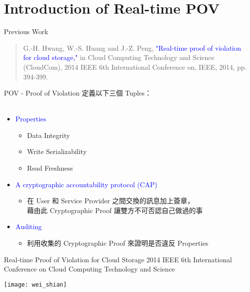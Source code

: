 \section{Introduction of Real-time POV}

\begin{frame}{Previous Work}
	\begin{quote}
    	\Large
        G.-H. Hwang, W.-S. Huang and J.-Z. Peng, \textcolor{blue}{"Real-time proof of violation for cloud storage,"} in Cloud Computing Technology and Science (CloudCom), 2014 IEEE 6th International Conference on, IEEE, 2014, pp. 394-399.
	\end{quote}
\end{frame}

\begin{frame}{POV - Proof of Violation}
	定義以下三個 Tuples：
    ~\\
    ~\\
	\begin{itemize}  
        \item \textcolor{blue}{Properties}
	        \begin{itemize}
            	\item Data Integrity
                \item Write Serializability
                \item Read Freshness
            \end{itemize}
        \item \textcolor{blue}{A cryptographic accountability protocol (CAP)}
	        \begin{itemize}
            	\item 在 User 和 Service Provider 之間交換的訊息加上簽章，\\ 藉由此 Cryptographic Proof 讓雙方不可否認自己做過的事
            \end{itemize}
        \item \textcolor{blue}{Auditing}
            \begin{itemize}
            	\item 利用收集的 Cryptographic Proof 來證明是否違反 Properties
            \end{itemize}
    \end{itemize}
\end{frame}

\begin{frame}{Real-time Proof of Violation for Cloud Storage}
{2014 IEEE 6th International Conference on Cloud Computing Technology and Science}
	\begin{center}
		\texttt{[image: wei\_shian]}
	\end{center}
\end{frame}

